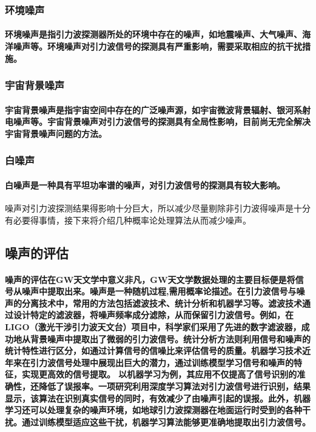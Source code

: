 \documentclass{article}
\begin{document}
\subsubsection{环境噪声}
\paragraph{环境噪声是指引力波探测器所处的环境中存在的噪声，如地震噪声、大气噪声、海洋噪声等。环境噪声对引力波信号的探测具有严重影响，需要采取相应的抗干扰措施。}
\subsubsection{宇宙背景噪声}
\paragraph{宇宙背景噪声是指宇宙空间中存在的广泛噪声源，如宇宙微波背景辐射、银河系射电噪声等。宇宙背景噪声对引力波信号的探测具有全局性影响，目前尚无完全解决宇宙背景噪声问题的方法。}
\subsubsection{白噪声}
\paragraph{白噪声是一种具有平坦功率谱的噪声，对引力波信号的探测具有较大影响。}
噪声对引力波探测结果得影响十分巨大，所以减少尽量剔除非引力波得噪声是十分有必要得事情，接下来将介绍几种概率论处理算法从而减少噪声。

\subsection{噪声的评估}
\paragraph{噪声的评估在GW天文学中意义非凡，GW天文学数据处理的主要目标便是将信号从噪声中提取出来。噪声是一种随机过程,需用概率论描述。在引力波信号与噪声的分离技术中，常用的方法包括滤波技术、统计分析和机器学习等。滤波技术通过设计特定的滤波器，将噪声频率成分滤除，从而保留引力波信号。例如，在LIGO（激光干涉引力波天文台）项目中，科学家们采用了先进的数字滤波器，成功地从背景噪声中提取出了微弱的引力波信号。统计分析方法则利用信号和噪声的统计特性进行区分，如通过计算信号的信噪比来评估信号的质量。机器学习技术近年来在引力波信号处理中展现出巨大的潜力，通过训练模型学习信号和噪声的特征，实现更高效的信号提取。
以机器学习为例，其应用不仅提高了信号识别的准确性，还降低了误报率。一项研究利用深度学习算法对引力波信号进行识别，结果显示，该算法在识别真实信号的同时，有效减少了由噪声引起的误报。此外，机器学习还可以处理复杂的噪声环境，如地球引力波探测器在地面运行时受到的各种干扰。通过训练模型适应这些干扰，机器学习算法能够更准确地提取出引力波信号。}
\end{document}
